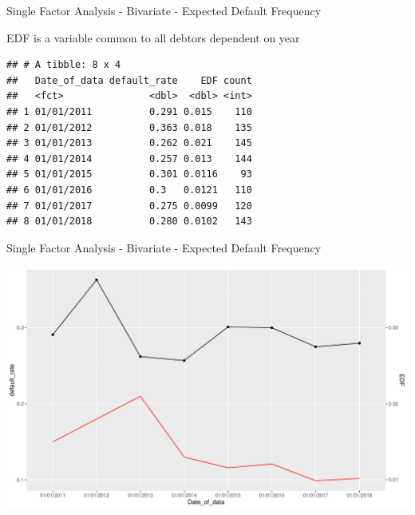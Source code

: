\documentclass[9pt,ignorenonframetext,]{beamer}
\newenvironment{Shaded}{\begin{snugshade}}{\end{snugshade}}
\newcommand{\KeywordTok}[1]{\textcolor[rgb]{0.13,0.29,0.53}{\textbf{#1}}}
\newcommand{\DataTypeTok}[1]{\textcolor[rgb]{0.13,0.29,0.53}{#1}}
\newcommand{\DecValTok}[1]{\textcolor[rgb]{0.00,0.00,0.81}{#1}}
\newcommand{\StringTok}[1]{\textcolor[rgb]{0.31,0.60,0.02}{#1}}
\newcommand{\OtherTok}[1]{\textcolor[rgb]{0.56,0.35,0.01}{#1}}
\newcommand{\OperatorTok}[1]{\textcolor[rgb]{0.81,0.36,0.00}{\textbf{#1}}}
\newcommand{\NormalTok}[1]{#1}
\begin{document}
\begin{frame}[fragile]{Single Factor Analysis - Bivariate - Expected
Default Frequency}

EDF is a variable common to all debtors dependent on year

\begin{Shaded}
\end{Shaded}

\begin{verbatim}
## # A tibble: 8 x 4
##   Date_of_data default_rate    EDF count
##   <fct>               <dbl>  <dbl> <int>
## 1 01/01/2011          0.291 0.015    110
## 2 01/01/2012          0.363 0.018    135
## 3 01/01/2013          0.262 0.021    145
## 4 01/01/2014          0.257 0.013    144
## 5 01/01/2015          0.301 0.0116    93
## 6 01/01/2016          0.3   0.0121   110
## 7 01/01/2017          0.275 0.0099   120
## 8 01/01/2018          0.280 0.0102   143
\end{verbatim}

\end{frame}

\begin{frame}{Single Factor Analysis - Bivariate - Expected Default
Frequency}

\includegraphics{Risk-Models-Development-Process_files/figure-beamer/unnamed-chunk-37-1.pdf}

\end{frame}
\end{document}
